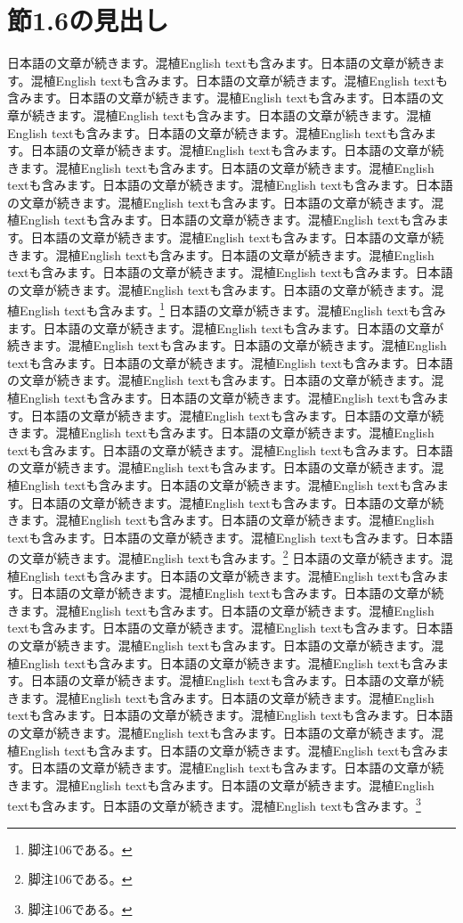 \documentclass[pdflatex,book]{jlreq}
\begin{document}
\section{節1.6の見出し}
日本語の文章が続きます。混植English textも含みます。日本語の文章が続きます。混植English textも含みます。日本語の文章が続きます。混植English textも含みます。日本語の文章が続きます。混植English textも含みます。日本語の文章が続きます。混植English textも含みます。日本語の文章が続きます。混植English textも含みます。日本語の文章が続きます。混植English textも含みます。日本語の文章が続きます。混植English textも含みます。日本語の文章が続きます。混植English textも含みます。日本語の文章が続きます。混植English textも含みます。日本語の文章が続きます。混植English textも含みます。日本語の文章が続きます。混植English textも含みます。日本語の文章が続きます。混植English textも含みます。日本語の文章が続きます。混植English textも含みます。日本語の文章が続きます。混植English textも含みます。日本語の文章が続きます。混植English textも含みます。日本語の文章が続きます。混植English textも含みます。日本語の文章が続きます。混植English textも含みます。日本語の文章が続きます。混植English textも含みます。日本語の文章が続きます。混植English textも含みます。\footnote{脚注106である。}
日本語の文章が続きます。混植English textも含みます。日本語の文章が続きます。混植English textも含みます。日本語の文章が続きます。混植English textも含みます。日本語の文章が続きます。混植English textも含みます。日本語の文章が続きます。混植English textも含みます。日本語の文章が続きます。混植English textも含みます。日本語の文章が続きます。混植English textも含みます。日本語の文章が続きます。混植English textも含みます。日本語の文章が続きます。混植English textも含みます。日本語の文章が続きます。混植English textも含みます。日本語の文章が続きます。混植English textも含みます。日本語の文章が続きます。混植English textも含みます。日本語の文章が続きます。混植English textも含みます。日本語の文章が続きます。混植English textも含みます。日本語の文章が続きます。混植English textも含みます。日本語の文章が続きます。混植English textも含みます。日本語の文章が続きます。混植English textも含みます。日本語の文章が続きます。混植English textも含みます。日本語の文章が続きます。混植English textも含みます。日本語の文章が続きます。混植English textも含みます。\footnote{脚注106である。}
日本語の文章が続きます。混植English textも含みます。日本語の文章が続きます。混植English textも含みます。日本語の文章が続きます。混植English textも含みます。日本語の文章が続きます。混植English textも含みます。日本語の文章が続きます。混植English textも含みます。日本語の文章が続きます。混植English textも含みます。日本語の文章が続きます。混植English textも含みます。日本語の文章が続きます。混植English textも含みます。日本語の文章が続きます。混植English textも含みます。日本語の文章が続きます。混植English textも含みます。日本語の文章が続きます。混植English textも含みます。日本語の文章が続きます。混植English textも含みます。日本語の文章が続きます。混植English textも含みます。日本語の文章が続きます。混植English textも含みます。日本語の文章が続きます。混植English textも含みます。日本語の文章が続きます。混植English textも含みます。日本語の文章が続きます。混植English textも含みます。日本語の文章が続きます。混植English textも含みます。日本語の文章が続きます。混植English textも含みます。日本語の文章が続きます。混植English textも含みます。\footnote{脚注106である。}
\end{document}
